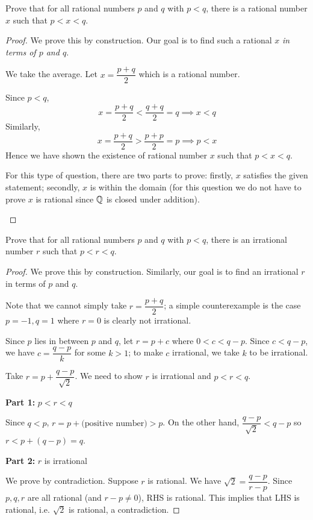 \begin{exercise}{}{}
Prove that for all rational numbers $p$ and $q$ with $p<q$, there is a rational number $x$ such that $p<x<q$.
\end{exercise}
\begin{proof}
We prove this by construction. Our goal is to find such a rational $x$ \emph{in terms of $p$ and $q$}.

We take the average. Let $x=\dfrac{p+q}{2}$ which is a rational number.

Since $p<q$, 
\[ x=\frac{p+q}{2}<\frac{q+q}{2}=q \implies x<q \]
Similarly,
\[ x=\frac{p+q}{2}>\frac{p+p}{2}=p \implies p<x \]
Hence we have shown the existence of rational number $x$ such that $p<x<q$.

\begin{remark}
For this type of question, there are two parts to prove: firstly, $x$ satisfies the given statement; secondly, $x$ is within the domain (for this question we do not have to prove $x$ is rational since $\mathbb Q$ is closed under addition).
\end{remark}
\end{proof}

\begin{exercise}{}{}
Prove that for all rational numbers $p$ and $q$ with $p<q$, there is an irrational number $r$ such that $p<r<q$.
\end{exercise}
\begin{proof}
We prove this by construction. Similarly, our goal is to find an irrational $r$ in terms of $p$ and $q$.

Note that we cannot simply take $r=\dfrac{p+q}{2}$; a simple counterexample is the case $p=-1,q=1$ where $r=0$ is clearly not irrational.

Since $p$ lies in between $p$ and $q$, let $r=p+c$ where $0<c<q-p$. Since $c<q-p$, we have $c=\dfrac{q-p}{k}$ for some $k>1$; to make $c$ irrational, we take $k$ to be irrational.

Take $r=p+\dfrac{q-p}{\sqrt{2}}$. We need to show $r$ is irrational and $p<r<q$.

\textbf{Part 1:} $p<r<q$

Since $q<p$, $r=p+\text{(positive number)}>p$. On the other hand, $\dfrac{q-p}{\sqrt{2}}<q-p$ so $r<p+(q-p)=q$.

\textbf{Part 2:} $r$ is irrational

We prove by contradiction. Suppose $r$ is rational. We have $\sqrt{2}=\dfrac{q-p}{r-p}$. Since $p,q,r$ are all rational (and $r-p\neq0$), RHS is rational. This implies that LHS is rational, i.e. $\sqrt{2}$ is rational, a contradiction.
\end{proof}

